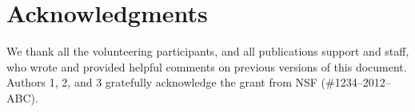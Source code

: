\documentclass[../main/Feedback.tex]{subfiles}
\begin{document}
\section{Acknowledgments}

We thank all the volunteering participants, and all publications support
and staff, who wrote and provided helpful comments on previous
versions of this document. Authors 1, 2, and 3 gratefully acknowledge
the grant from NSF (\#1234--2012--ABC). 
\end{document}
